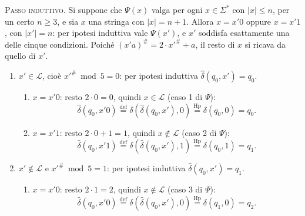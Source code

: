 \documentclass[a4paper, 11pt, oneside]{book}
\theoremstyle{formale}
\begin{document}
    \textsc{Passo induttivo}. Si suppone che $\Psi(x)$ valga per ogni $x \in \Sigma^*$ con
    $|x| \leq n$, per un certo $n \geq 3$, e sia $x$ una stringa con $|x| = n + 1$. Allora
    $x = x'0$ oppure $x = x'1$, con $|x'| = n$: per ipotesi induttiva vale $\Psi(x')$, e
    $x'$ soddisfa esattamente una delle cinque condizioni. Poich\'e
    $(x'a)^\# = 2 \cdot x'^\# + a$, il resto di $x$ si ricava da quello di $x'$.
    \begin{enumerate}
        \item $x' \in \mathcal{L}$, cio\`e $x'^\# \bmod 5 = 0$: per ipotesi induttiva
            $\hat{\delta}(q_0, x') = q_0$.
            \begin{enumerate}[label=\arabic{enumi}\alph*.]
                \item $x = x'0$: resto $2 \cdot 0 = 0$, quindi $x \in \mathcal{L}$ (caso 1
                    di $\Psi$):
                    \begin{equation*}
                        \hat{\delta}(q_0, x'0)
                        \overset{\text{def}}{=} \delta(\hat{\delta}(q_0, x'), 0)
                        \overset{\text{Hp}}{=} \delta(q_0, 0) = q_0.
                    \end{equation*}
                \item $x = x'1$: resto $2 \cdot 0 + 1 = 1$, quindi $x \notin \mathcal{L}$
                    (caso 2 di $\Psi$):
                    \begin{equation*}
                        \hat{\delta}(q_0, x'1)
                        \overset{\text{def}}{=} \delta(\hat{\delta}(q_0, x'), 1)
                        \overset{\text{Hp}}{=} \delta(q_0, 1) = q_1.
                    \end{equation*}
            \end{enumerate}
        \item $x' \notin \mathcal{L}$ e $x'^\# \bmod 5 = 1$: per ipotesi induttiva
            $\hat{\delta}(q_0, x') = q_1$.
            \begin{enumerate}[label=\arabic{enumi}\alph*.]
                \item $x = x'0$: resto $2 \cdot 1 = 2$, quindi $x \notin \mathcal{L}$ (caso
                    3 di $\Psi$):
                    \begin{equation*}
                        \hat{\delta}(q_0, x'0)
                        \overset{\text{def}}{=} \delta(\hat{\delta}(q_0, x'), 0)
                        \overset{\text{Hp}}{=} \delta(q_1, 0) = q_2.
                    \end{equation*}

\end{enumerate}
\end{enumerate}
\end{document}
